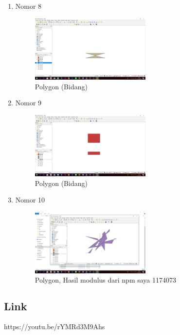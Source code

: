 \begin{enumerate}
	\item Nomor 8
	
	\begin{figure}[H]
		\includegraphics[width=6cm]{figures/Tugas2/1174073/No8.png}
		\centering
		\caption{Polygon (Bidang)}
	\end{figure}
	\item Nomor 9
	
	\begin{figure}[H]
		\includegraphics[width=6cm]{figures/Tugas2/1174073/No9.png}
		\centering
		\caption{Polygon (Bidang)}
	\end{figure}
	\item Nomor 10
	
	\begin{figure}[H]
		\includegraphics[width=6cm]{figures/Tugas2/1174073/No10.png}
		\centering
		\caption{Polygon, Hasil modulus dari npm saya 1174073}
	\end{figure}
\end{enumerate}
\subsection{Link}
https://youtu.be/rYMRd3M9Ahs
